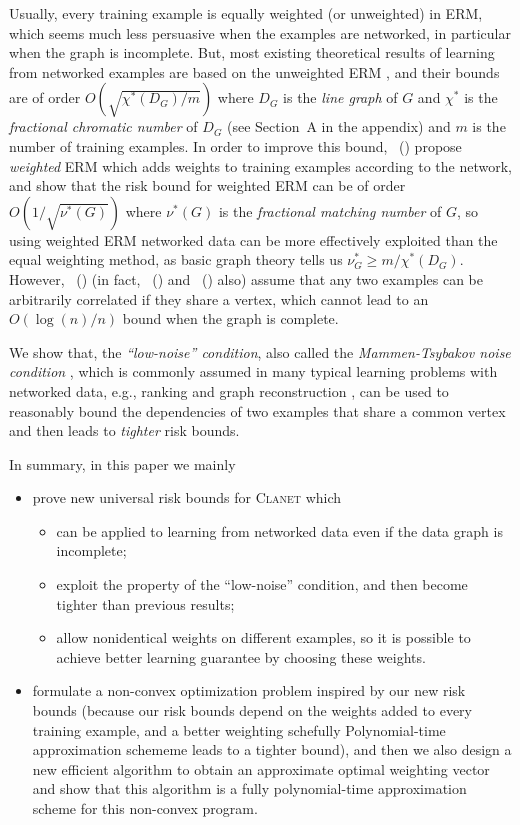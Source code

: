 \documentclass[letterpaper]{article} %
\newcommand{\problemabbr}{\textnormal{C}\textsc{lanet}}
\newcommand{\citet}[1]{\citeauthor{#1}\ (\citeyear{#1})}
\begin{document}
Usually, every training example is equally weighted (or unweighted) in ERM, which seems much less persuasive when the examples are networked, in particular when the graph is incomplete. But, most existing theoretical results of learning from networked examples are based on the unweighted ERM \cite{Usunier2005,ralaivola2009chromatic}, and their bounds are of order $O(\sqrt{\chi^*(D_G)/m})$ where $D_G$ is the \emph{line graph} of $G$ and $\chi^*$ is the \emph{fractional chromatic number} of $D_G$ (see Section~A in the appendix) and $m$ is the number of training examples. 
In order to improve this bound, \citet{wang2017learning} propose \emph{weighted} ERM %
which adds weights to training examples 
according to the network, and show that the risk bound for weighted ERM can be of order $O(1/\sqrt{\nu^*(G)})$ where $\nu^*(G)$ is the \emph{fractional matching number} of $G$, so using weighted ERM networked data can be more effectively exploited than the equal weighting method, as basic graph theory tells us $\nu^*_G\ge m / \chi^*(D_G)$. 
However, \citet{wang2017learning} (in fact, \citet{Usunier2005} and \citet{ralaivola2009chromatic} also) assume that any two examples can be arbitrarily correlated if they share a vertex, which cannot lead to an $O(\log(n)/n)$ bound when the graph is complete. 

We show that, the \emph{``low-noise'' condition}, also called the \emph{Mammen-Tsybakov noise condition}  \cite{Mammen1998Smooth}, which is commonly assumed in many typical learning problems with networked data, e.g., ranking \cite{clemenccon2008ranking} and graph reconstruction \cite{papa2016graph}, can be used to reasonably bound the dependencies of two examples that share a common vertex and then leads to \emph{tighter} risk bounds. 

In summary, in this paper we mainly 
\begin{itemize}
\item prove new universal risk bounds for \problemabbr{} which
\begin{itemize}
\item can be applied to learning from networked data even if the data graph is incomplete; 
\item exploit the property of the ``low-noise'' condition, and then become tighter than previous results; 
\item allow nonidentical weights on different examples, so it is possible to achieve better learning guarantee by choosing these weights.
\end{itemize}
\item formulate a non-convex optimization problem inspired by our new risk bounds (because our risk bounds depend on the weights added to every training example, and a better weighting schefully Polynomial-time approximation schememe leads to a tighter bound), and then we also design a new efficient algorithm to obtain an approximate optimal weighting vector and show that this algorithm is a fully polynomial-time approximation scheme for this non-convex program. 
\end{itemize}
\end{document}
